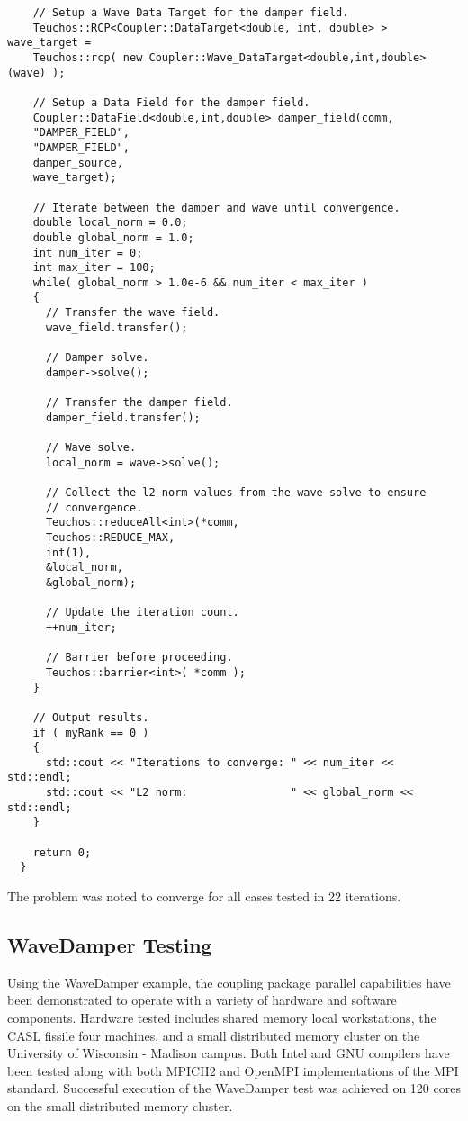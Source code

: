 \documentclass[letterpaper]{article}
\begin{document}
\begin{lstlisting}
    // Setup a Wave Data Target for the damper field.
    Teuchos::RCP<Coupler::DataTarget<double, int, double> > wave_target = 
    Teuchos::rcp( new Coupler::Wave_DataTarget<double,int,double>(wave) );

    // Setup a Data Field for the damper field.
    Coupler::DataField<double,int,double> damper_field(comm,
    "DAMPER_FIELD",
    "DAMPER_FIELD",
    damper_source,
    wave_target);

    // Iterate between the damper and wave until convergence.
    double local_norm = 0.0;
    double global_norm = 1.0;
    int num_iter = 0;
    int max_iter = 100;
    while( global_norm > 1.0e-6 && num_iter < max_iter )
    {
      // Transfer the wave field.
      wave_field.transfer();

      // Damper solve.
      damper->solve();

      // Transfer the damper field.
      damper_field.transfer();

      // Wave solve.
      local_norm = wave->solve();

      // Collect the l2 norm values from the wave solve to ensure
      // convergence. 
      Teuchos::reduceAll<int>(*comm,
      Teuchos::REDUCE_MAX, 
      int(1), 
      &local_norm, 
      &global_norm);

      // Update the iteration count.
      ++num_iter;

      // Barrier before proceeding.
      Teuchos::barrier<int>( *comm );
    }

    // Output results.
    if ( myRank == 0 )
    {
      std::cout << "Iterations to converge: " << num_iter << std::endl;
      std::cout << "L2 norm:                " << global_norm << std::endl;
    }

    return 0;
  }
\end{lstlisting}

The problem was noted to converge for all cases tested in 22 iterations.

\subsection{WaveDamper Testing}

Using the WaveDamper example, the coupling package parallel
capabilities have been demonstrated to operate with a variety of
hardware and software components. Hardware tested includes shared
memory local workstations, the CASL fissile four machines, and a small
distributed memory cluster on the University of Wisconsin - Madison
campus. Both Intel and GNU compilers have been tested along with both
MPICH2 and OpenMPI implementations of the MPI standard. Successful
execution of the WaveDamper test was achieved on 120 cores on the
small distributed memory cluster.
\end{document}
